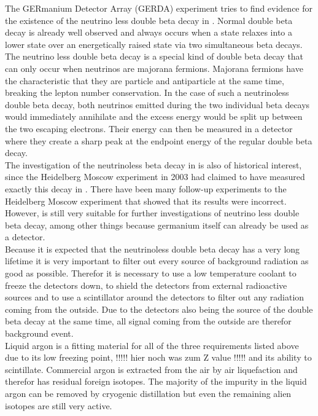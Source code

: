 The GERmanium Detector Array (GERDA) experiment tries to find evidence for the existence of the neutrino less double beta decay in .
Normal double beta decay is already well observed and always occurs when a state relaxes into a lower state over an energetically raised state via two simultaneous beta decays.
The neutrino less double beta decay is a special kind of double beta decay that can only occur when neutrinos are majorana fermions.
Majorana fermions have the characteristic that they are particle and antiparticle at the same time, breaking the lepton number conservation.
In the case of such a neutrinoless double beta decay, both neutrinos emitted during the two individual beta decays would immediately annihilate and the excess energy would be split up between the two escaping electrons.
Their energy can then be measured in a detector where they create a sharp peak at the endpoint energy of the regular double beta decay.
\\

The investigation of the neutrinoless beta decay in \Ge is also of historical interest, since the Heidelberg Moscow experiment in 2003 had claimed to have measured exactly this decay in \Ge.
There have been many follow-up experiments to the Heidelberg Moscow experiment that showed that its results were incorrect.
However, \Ge is still very suitable for further investigations of neutrino less double beta decay, among other things because germanium itself can already be used as a detector.
\\

Because it is expected that the neutrinoless double beta decay has a very long lifetime it is very important to filter out every source of background radiation as good as possible. 
Therefor it is necessary to use a low temperature coolant to freeze the  detectors down, to shield the detectors from external radioactive sources and to use a scintillator around the detectors to filter out any radiation coming from the outside. 
Due to the \Ge detectors also being the source of the double beta decay at the same time, all signal coming from the outside are therefor background event. 
\\

Liquid argon is a fitting material for all of the three requirements listed above due to its low freezing point, !!!!! hier noch was zum Z value !!!!! and its ability to scintillate. 
Commercial argon is extracted from the air by air liquefaction and therefor has residual foreign isotopes. 
The majority of the impurity in the liquid argon can be removed by cryogenic distillation but even the remaining alien isotopes are still very active.\\

